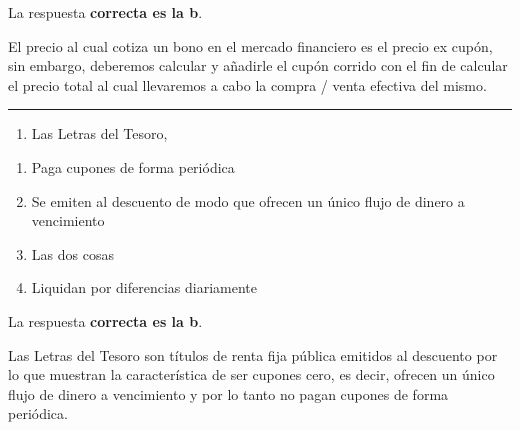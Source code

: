 \documentclass[
  letterpaper,
  DIV=11,
  numbers=noendperiod]{scrreprt}
\providecommand{\tightlist}{%
  \setlength{\itemsep}{0pt}\setlength{\parskip}{0pt}}\usepackage{longtable,booktabs,array}
\begin{document}
\begin{tcolorbox}[enhanced jigsaw, left=2mm, opacityback=0, colback=white, breakable, arc=.35mm, bottomrule=.15mm, rightrule=.15mm, toprule=.15mm, leftrule=.75mm, colframe=quarto-callout-tip-color-frame]
\begin{minipage}[t]{5.5mm}
\textcolor{quarto-callout-tip-color}{\faLightbulb}
\end{minipage}%
\begin{minipage}[t]{\textwidth - 5.5mm}

La respuesta \textbf{correcta es la b}.

El precio al cual cotiza un bono en el mercado financiero es el precio
ex cupón, sin embargo, deberemos calcular y añadirle el cupón corrido
con el fin de calcular el precio total al cual llevaremos a cabo la
compra / venta efectiva del mismo.

\end{minipage}%
\end{tcolorbox}

\begin{center}\rule{0.5\linewidth}{0.5pt}\end{center}

\begin{enumerate}
\def\labelenumi{\arabic{enumi}.}
\setcounter{enumi}{82}
\tightlist
\item
  Las Letras del Tesoro,
\end{enumerate}

\begin{enumerate}
\def\labelenumi{\alph{enumi})}
\item
  Paga cupones de forma periódica
\item
  Se emiten al descuento de modo que ofrecen un único flujo de dinero a
  vencimiento
\item
  Las dos cosas
\item
  Liquidan por diferencias diariamente
\end{enumerate}

\begin{tcolorbox}[enhanced jigsaw, left=2mm, opacityback=0, colback=white, breakable, arc=.35mm, bottomrule=.15mm, rightrule=.15mm, toprule=.15mm, leftrule=.75mm, colframe=quarto-callout-tip-color-frame]
\begin{minipage}[t]{5.5mm}
\textcolor{quarto-callout-tip-color}{\faLightbulb}
\end{minipage}%
\begin{minipage}[t]{\textwidth - 5.5mm}

La respuesta \textbf{correcta es la b}.

Las Letras del Tesoro son títulos de renta fija pública emitidos al
descuento por lo que muestran la característica de ser cupones cero, es
decir, ofrecen un único flujo de dinero a vencimiento y por lo tanto no
pagan cupones de forma periódica.

\end{minipage}%
\end{tcolorbox}
\end{document}
